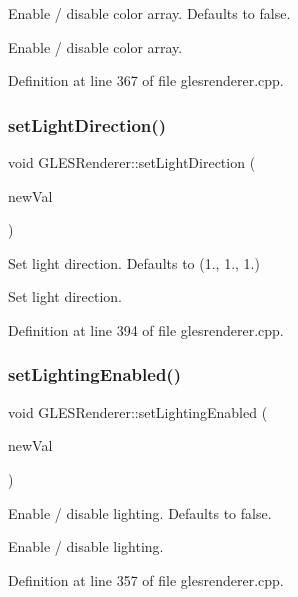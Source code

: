 Enable / disable color array. Defaults to false.

Enable / disable color array. 

Definition at line 367 of file glesrenderer.\+cpp.

\mbox{\label{class_g_l_e_s_renderer_a4f755a8549d3ecbb2a40cabe56974c5f}} 
\subsubsection{\texorpdfstring{setLightDirection()}{setLightDirection()}}
{\footnotesize\ttfamily void G\+L\+E\+S\+Renderer\+::set\+Light\+Direction (\begin{DoxyParamCaption}\item[{const Q\+Vector3D \&}]{new\+Val }\end{DoxyParamCaption})}

Set light direction. Defaults to (1., 1., 1.)

Set light direction. 

Definition at line 394 of file glesrenderer.\+cpp.

\mbox{\label{class_g_l_e_s_renderer_ae6e3531d53ffdc334688eec3feaf9e77}} 
\subsubsection{\texorpdfstring{setLightingEnabled()}{setLightingEnabled()}}
{\footnotesize\ttfamily void G\+L\+E\+S\+Renderer\+::set\+Lighting\+Enabled (\begin{DoxyParamCaption}\item[{bool}]{new\+Val }\end{DoxyParamCaption})}

Enable / disable lighting. Defaults to false.

Enable / disable lighting. 

Definition at line 357 of file glesrenderer.\+cpp.

\mbox{\label{class_g_l_e_s_renderer_a180fe52b28553039f83b07157b962c3e}} 
